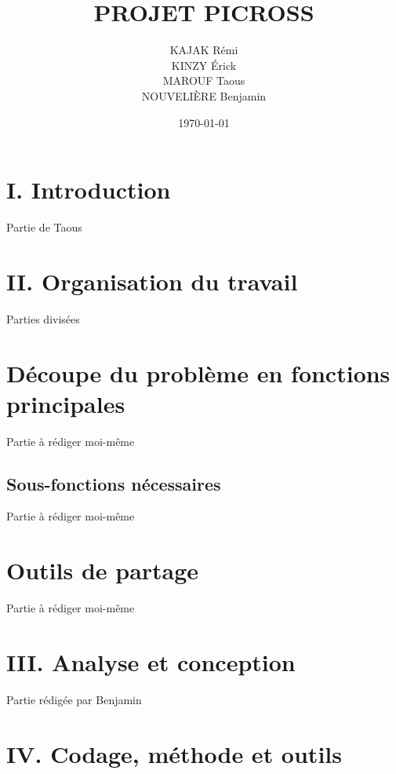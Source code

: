 \documentclass[a4paper,11pt]{article}
\begin{document}
\pagestyle{fancy}
\title{PROJET PICROSS}
\author{KAJAK Rémi\\KINZY Érick\\MAROUF Taous\\NOUVELIÈRE Benjamin}
\date{\today}
\maketitle
\tableofcontents
\newpage
\section*{\LARGE I. \hspace*{0.1cm} Introduction}
\label{section*:introduction}
Partie de Taous
\section*{\LARGE II. Organisation du travail}
\label{section*:organisation_travail}
Parties divisées
\section[Fonctions principales]{Découpe du problème en fonctions principales}
\label{section:fonctions_principales}
Partie à rédiger moi-même
\subsection[Sous-fonctions]{Sous-fonctions nécessaires}
\label{subsection:sous_fonctions}
Partie à rédiger moi-même
\section{Outils de partage}
\label{section:outils_partage}
Partie à rédiger moi-même
\section*{\LARGE III. Analyse et conception}
\label{section*:analyse_conception}
Partie rédigée par Benjamin
\section*{\LARGE IV. Codage, méthode et outils}
\label{section*:codage_methode_outils}
\end{document}
